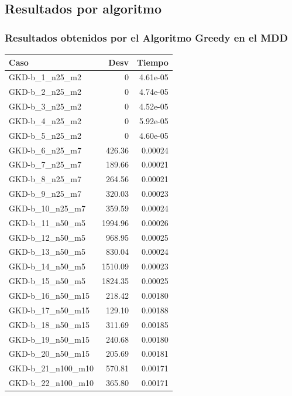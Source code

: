 \documentclass{article}
\begin{document}
\subsection{Resultados por algoritmo}

\subsubsection{Resultados obtenidos por el Algoritmo Greedy en el MDD}

\begin{table}[ht]
\centering
\footnotesize
\begin{tabular}{|l|r|r|}
\hline
\textbf{Caso} & \textbf{Desv} & \textbf{Tiempo} \\ \hline
GKD-b\_1\_n25\_m2 & 0 & 4.61e-05 \\ \hline
GKD-b\_2\_n25\_m2 & 0 & 4.74e-05 \\ \hline
GKD-b\_3\_n25\_m2 & 0 & 4.52e-05 \\ \hline
GKD-b\_4\_n25\_m2 & 0 & 5.92e-05 \\ \hline
GKD-b\_5\_n25\_m2 & 0 & 4.60e-05 \\ \hline
GKD-b\_6\_n25\_m7 & 426.36 & 0.00024 \\ \hline
GKD-b\_7\_n25\_m7 & 189.66 & 0.00021 \\ \hline
GKD-b\_8\_n25\_m7 & 264.56 & 0.00021 \\ \hline
GKD-b\_9\_n25\_m7 & 320.03 & 0.00023 \\ \hline
GKD-b\_10\_n25\_m7 & 359.59 & 0.00024 \\ \hline
GKD-b\_11\_n50\_m5 & 1994.96 & 0.00026 \\ \hline
GKD-b\_12\_n50\_m5 & 968.95 & 0.00025 \\ \hline
GKD-b\_13\_n50\_m5 & 830.04 & 0.00024 \\ \hline
GKD-b\_14\_n50\_m5 & 1510.09 & 0.00023 \\ \hline
GKD-b\_15\_n50\_m5 & 1824.35 & 0.00025 \\ \hline
GKD-b\_16\_n50\_m15 & 218.42 & 0.00180 \\ \hline
GKD-b\_17\_n50\_m15 & 129.10 & 0.00188 \\ \hline
GKD-b\_18\_n50\_m15 & 311.69 & 0.00185 \\ \hline
GKD-b\_19\_n50\_m15 & 240.68 & 0.00180 \\ \hline
GKD-b\_20\_n50\_m15 & 205.69 & 0.00181 \\ \hline
GKD-b\_21\_n100\_m10 & 570.81 & 0.00171 \\ \hline
GKD-b\_22\_n100\_m10 & 365.80 & 0.00171 \\ \hline

\end{tabular}
\end{table}
\end{document}
